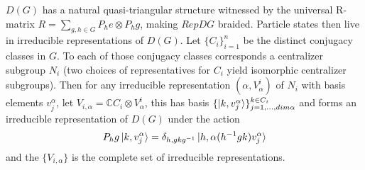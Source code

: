\documentclass{article}
\begin{document}
$D(G)$ has a natural quasi-triangular structure witnessed by the universal R-matrix $R=\sum_{g,h \in G}P_he \otimes P_hg$, making $RepDG$ braided. Particle states then live in irreducible representations of $D(G)$. Let $\{C_i\}_{i=1}^n$ be the distinct conjugacy classes in $G$. To each of those conjugacy classes corresponds a centralizer subgroup $N_i$ (two choices of representatives for $C_i$ yield isomorphic centralizer subgroups). Then for any irreducible representation $(\alpha,V^i_\alpha)$ of $N_i$ with basis elements $v^\alpha_j$, let $V_{i,\alpha} = \mathbb{C}C_i \otimes V^i_\alpha$, this has basis $\{ \ket{k,v^\alpha_j} \}_{j=1,...,dim\alpha}^{k\in C_i}$ and forms an irreducible representation of $D(G)$ under the action 
\begin{equation}
P_hg\ket{k,v^\alpha_j} = \delta_{h,gkg^{-1}} \ket{h,\alpha(h^{-1}gk)v^\alpha_j}
\end{equation}
and the $\{V_{i,\alpha}\}$ is the complete set of irreducible representations.

\end{document}
